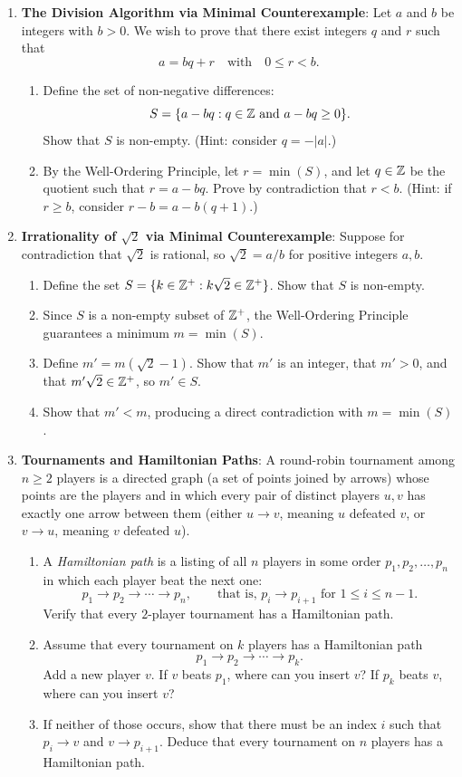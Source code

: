 \begin{enumerate}
  \item \textbf{The Division Algorithm via Minimal Counterexample}:
  Let $a$ and $b$ be integers with $b > 0$. We wish to prove that there exist integers $q$ and $r$ such that
  \[
  a = bq + r \quad \text{with} \quad 0 \le r < b.
  \]
  \begin{enumerate}
    \item Define the set of non-negative differences:
    \[
    S = \{a - bq : q \in \mathbb{Z} \text{ and } a - bq \ge 0\}.
    \]
    Show that $S$ is non-empty. (Hint: consider $q = -|a|$.)
    \item By the Well-Ordering Principle, let $r = \min(S)$, and let $q \in \mathbb{Z}$ be the quotient such that $r = a - bq$. Prove by contradiction that $r < b$. (Hint: if $r \ge b$, consider $r - b = a - b(q+1)$.)
  \end{enumerate}

  \item \textbf{Irrationality of $\sqrt{2}$ via Minimal Counterexample}:
  Suppose for contradiction that $\sqrt{2}$ is rational, so $\sqrt{2} = a/b$ for positive integers $a, b$.
  \begin{enumerate}
    \item Define the set $S = \{k \in \mathbb{Z}^+ : k\sqrt{2} \in \mathbb{Z}^+\}$. Show that $S$ is non-empty.
    \item Since $S$ is a non-empty subset of $\mathbb{Z}^+$, the Well-Ordering Principle guarantees a minimum $m = \min(S)$.
    \item Define $m' = m(\sqrt{2} - 1)$. Show that $m'$ is an integer, that $m' > 0$, and that $m'\sqrt{2} \in \mathbb{Z}^+$, so $m' \in S$.
    \item Show that $m' < m$, producing a direct contradiction with $m = \min(S)$.
  \end{enumerate}

  \item \textbf{Tournaments and Hamiltonian Paths}:
  A round-robin tournament among $n \ge 2$ players is a directed graph (a set of points joined by arrows) whose points are the players and in which every pair of distinct players $u, v$ has exactly one arrow between them (either $u \to v$, meaning $u$ defeated $v$, or $v \to u$, meaning $v$ defeated $u$).
  \begin{enumerate}
    \item A \emph{Hamiltonian path} is a listing of all $n$ players in some order $p_1, p_2, \dots, p_n$ in which each player beat the next one:
    \[
    p_1 \to p_2 \to \cdots \to p_n, \qquad \text{that is, } p_i \to p_{i+1} \text{ for } 1 \le i \le n-1.
    \]
    Verify that every $2$-player tournament has a Hamiltonian path.
    \item Assume that every tournament on $k$ players has a Hamiltonian path
    \[
    p_1 \to p_2 \to \cdots \to p_k.
    \]
    Add a new player $v$. If $v$ beats $p_1$, where can you insert $v$? If $p_k$ beats $v$, where can you insert $v$?
    \item If neither of those occurs, show that there must be an index $i$ such that $p_i \to v$ and $v \to p_{i+1}$. Deduce that every tournament on $n$ players has a Hamiltonian path.
  \end{enumerate}
\end{enumerate}

\newpage
